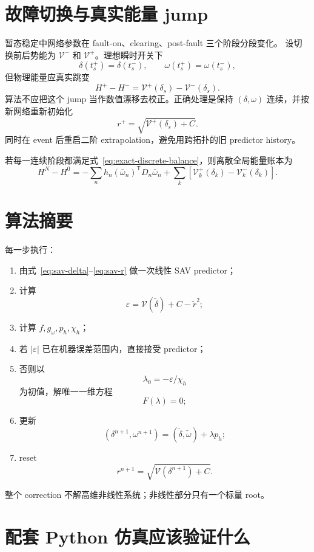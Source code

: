 \documentclass[UTF8,11pt,a4paper]{ctexart}
\theoremstyle{definition}
\theoremstyle{remark}
\newcommand{\T}{\mathsf{T}}
\newcommand{\V}{\mathcal V}
\newcommand{\wt}{\widetilde}
\begin{document}
\section{故障切换与真实能量 jump}

暂态稳定中网络参数在 fault-on、clearing、post-fault 三个阶段分段变化。
设切换前后势能为 \(\V^-\) 和 \(\V^+\)。理想瞬时开关下
\[
 \delta(t_s^+)=\delta(t_s^-),
 \qquad
 \omega(t_s^+)=\omega(t_s^-),
\]
但物理能量应真实跳变
\begin{equation}
 \boxed{
 H^+-H^-
 =
 \V^+(\delta_s)-\V^-(\delta_s).}
 \label{eq:switch-jump}
\end{equation}
算法不应把这个 jump 当作数值漂移去校正。正确处理是保持
\((\delta,\omega)\) 连续，并按新网络重新初始化
\[
 r^+
 =
 \sqrt{\V^+(\delta_s)+C}.
\]
同时在 event 后重启二阶 extrapolation，避免用跨拓扑的旧 predictor history。

若每一连续阶段都满足式~\eqref{eq:exact-discrete-balance}，则离散全局能量账本为
\begin{equation}
 H^N-H^0
 =
 -\sum_n
 h_n(\bar\omega_n)^\T D_n\bar\omega_n
 +
 \sum_k
 \left[
 \V_k^+(\delta_k)-\V_k^-(\delta_k)
 \right].
 \label{eq:piecewise-energy}
\end{equation}

\section{算法摘要}

每一步执行：
\begin{enumerate}[label=\arabic*.]
 \item 由式~\eqref{eq:sav-delta}--\eqref{eq:sav-r} 做一次线性 SAV predictor；
 \item 计算
 \[
  \varepsilon
  =
  \V(\wt\delta)+C-\wt r^2;
 \]
 \item 计算 \(f,g_\omega,p_h,\chi_h\)；
 \item 若 \(|\varepsilon|\) 已在机器误差范围内，直接接受 predictor；
 \item 否则以
 \[
  \lambda_0=-\varepsilon/\chi_h
 \]
 为初值，解唯一一维方程
 \[
  F(\lambda)=0;
 \]
 \item 更新
 \[
  (\delta^{n+1},\omega^{n+1})
  =
  (\wt\delta,\wt\omega)+\lambda p_h;
 \]
 \item reset
 \[
  r^{n+1}=\sqrt{\V(\delta^{n+1})+C}.
 \]
\end{enumerate}

整个 correction 不解高维非线性系统；非线性部分只有一个标量 root。

\section{配套 Python 仿真应该验证什么}
\end{document}

